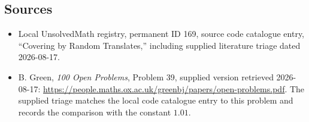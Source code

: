 \documentclass[11pt]{article}
\begin{document}
\subsection{Sources}
\begin{itemize}
\item Local UnsolvedMath registry, permanent ID 169, source code catalogue entry, ``Covering by Random Translates,'' including supplied literature triage dated 2026-08-17.
\item B. Green, \emph{100 Open Problems}, Problem 39, supplied version retrieved 2026-08-17: \url{https://people.maths.ox.ac.uk/greenbj/papers/open-problems.pdf}. The supplied triage matches the local code catalogue entry to this problem and records the comparison with the constant \(1.01\).
\end{itemize}
\end{document}
